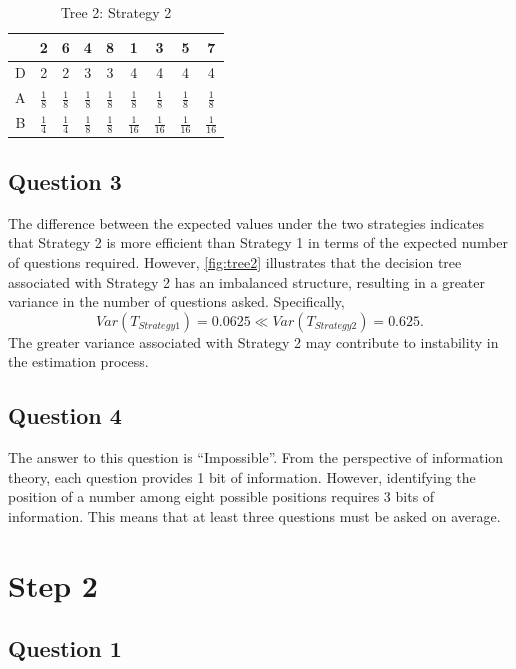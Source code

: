 \documentclass[10pt,a4paper]{article}
\begin{document}
	\begin{table}[htbp]
		\centering
		\renewcommand{\arraystretch}{1.2}
		\caption{Tree 2: Strategy 2}
		\label{tab:Distribution of A and B}
		\begin{tabular}{ccccccccc}
			\toprule
			& 2 & 6 & 4 & 8 & 1 & 3 & 5 & 7 \\
			\midrule
			D & 2 & 2 & 3 & 3 & 4 & 4 & 4 & 4 \\
			A & \(\frac{1}{8}\) & \(\frac{1}{8}\) & \(\frac{1}{8}\) & \(\frac{1}{8}\) & \(\frac{1}{8}\) & \(\frac{1}{8}\) & \(\frac{1}{8}\) & \(\frac{1}{8}\) \\
			B & \(\frac{1}{4}\) & \(\frac{1}{4}\) & \(\frac{1}{8}\) & \(\frac{1}{8}\) & \(\frac{1}{16}\) & \(\frac{1}{16}\) & \(\frac{1}{16}\) & \(\frac{1}{16}\) \\
			\bottomrule
		\end{tabular}
	\end{table}
	
	\subsection{Question 3}
	The difference between the expected values under the two strategies indicates that Strategy 2 is more efficient than Strategy 1 in terms of the expected number of questions required. However, \cref{fig:tree2} illustrates that the decision tree associated with Strategy 2 has an imbalanced structure, resulting in a greater variance in the number of questions asked. Specifically,
	\[
	Var(T_{Strategy 1})=0.0625 \ll Var(T_{Strategy 2})=0.625.
	\]
	The greater variance associated with Strategy 2 may contribute to instability in the estimation process.
	
	\subsection{Question 4}
	The answer to this question is ``Impossible''. From the perspective of information theory, each question provides 1 bit of information. However, identifying the position of a number among eight possible positions requires 3 bits of information. This means that at least three questions must be asked on average.
	
	\section{Step 2}
	
	\subsection{Question 1}
	
\end{document}
